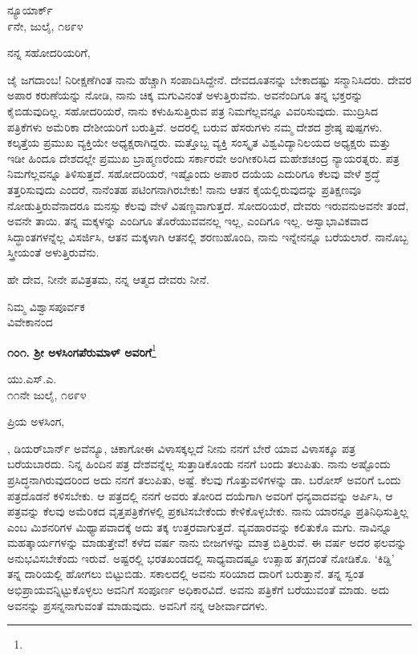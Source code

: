 \begin{flushright}
ನ್ಯೂಯಾರ್ಕ್\\೯ನೇ, ಜುಲೈ, ೧೮೯೪
\end{flushright}

\noindent
ನನ್ನ ಸಹೋದರಿಯರಿಗೆ,

ಜೈ ಜಗದಾಂಬ! ನಿರೀಕ್ಷಣೆಗಿಂತ ನಾನು ಹೆಚ್ಚಾಗಿ ಸಂಪಾದಿಸಿದ್ದೇನೆ. ದೇವದೂತನನ್ನು ಬೇಕಾದಷ್ಟು ಸನ್ಮಾನಿಸಿದರು. ದೇವರ ಅಪಾರ ಕರುಣೆಯನ್ನು ನೋಡಿ, ನಾನು ಚಿಕ್ಕ ಮಗುವಿನಂತೆ ಅಳುತ್ತಿರುವೆನು. ಅವನೆಂದಿಗೂ ತನ್ನ ಭಕ್ತರನ್ನು ಕೈಬಿಡುವುದಿಲ್ಲ. ಸಹೋದರಿಯರೆ, ನಾನು ಕಳುಹಿಸುತ್ತಿರುವ ಪತ್ರ ನಿಮಗೆಲ್ಲವನ್ನೂ ವಿವರಿಸುವುದು. ಮುದ್ರಿಸಿದ ಪತ್ರಿಕೆಗಳು ಅಮೆರಿಕಾ ದೇಶೀಯರಿಗೆ ಬರುತ್ತಿವೆ. ಅದರಲ್ಲಿ ಬರುವ ಹೆಸರುಗಳು ನಮ್ಮ ದೇಶದ ಶ್ರೇಷ್ಠ ಪುಷ್ಪಗಳು. ಕಲ್ಕತ್ತೆಯ ಪ್ರಮುಖ ವ್ಯಕ್ತಿಯೇ ಅಧ್ಯಕ್ಷರಾಗಿದ್ದರು. ಮತ್ತೊಬ್ಬ ವ್ಯಕ್ತಿ ಸಂಸ್ಕೃತ ವಿಶ್ವವಿದ್ಯಾನಿಲಯದ ಅಧ್ಯಕ್ಷರು ಮತ್ತು ಇಡೀ ಹಿಂದೂ ದೇಶದಲ್ಲೇ ಪ್ರಮುಖ ಬ್ರಾಹ್ಮಣರೆಂದು ಸರ್ಕಾರವೇ ಅಂಗೀಕರಿಸಿದ ಮಹೇಶಚಂದ್ರ ನ್ಯಾಯರತ್ನರು. ಪತ್ರ ನಿಮಗೆಲ್ಲವನ್ನೂ ತಿಳಿಸುತ್ತದೆ. ಸಹೋದರಿಯರೆ, ಇಷ್ಟೊಂದು ಅಪಾರ ದಯೆಯ ಎದುರಿಗೂ ಕೆಲವು ವೇಳೆ ಶ್ರದ್ಧೆ ತತ್ತರಿಸುವುದು ಎಂದರೆ, ನಾನೆಂತಹ ಪಟಿಂಗನಾಗಿರಬೇಕು! ನಾನು ಆತನ ಕೈಯಲ್ಲಿರುವುದನ್ನು ಪ್ರತಿಕ್ಷಣವೂ ನೋಡುತ್ತಿರುವೆನಾದರೂ ಮನಸ್ಸು ಕೆಲವು ವೇಳೆ ವಿಷಣ್ಣವಾಗುತ್ತದೆ. ಸೋದರಿಯರೆ, ದೇವರು ಇರುವನು\enginline{-}ಅವನೇ ತಂದೆ, ಅವನೇ ತಾಯಿ. ತನ್ನ ಮಕ್ಕಳನ್ನು ಎಂದಿಗೂ ತೊರೆಯುವವನಲ್ಲ \enginline{-}ಇಲ್ಲ, ಎಂದಿಗೂ ಇಲ್ಲ. ಅಸ್ವಾಭಾವಿಕವಾದ ಸಿದ್ಧಾಂತಗಳನ್ನೆಲ್ಲ ವಿಸರ್ಜಿಸಿ, ಆತನ ಮಕ್ಕಳಾಗಿ ಆತನಲ್ಲಿ ಶರಣುಹೊಂದಿ, ನಾನು ಇನ್ನೇನನ್ನೂ ಬರೆಯಲಾರೆ. ನಾನೊಬ್ಬ ಸ್ತ್ರೀಯಂತೆ ಅಳುತ್ತಿರುವೆನು.

\eject

ಹೇ ದೇವ, ನೀನೇ ಪವಿತ್ರತಮ, ನನ್ನ ಆತ್ಮದ ದೇವರು ನೀನೆ.

{\flushright
ನಿಮ್ಮ ವಿಶ್ವಾಸಪೂರ್ವಕ\\ವಿವೇಕಾನಂದ\par}

\begin{center}
\textbf{೧೦೧. ಶ‍್ರೀ ಅಳಸಿಂಗಪೆರುಮಾಳ್ ಅವರಿಗೆ}\footnote{}
\end{center}

\begin{flushright}
ಯು.ಎಸ್.ಎ.\\೧೧ನೇ ಜುಲೈ, ೧೮೯೪
\end{flushright}

\noindent
ಪ್ರಿಯ ಅಳಸಿಂಗ,
\vspace{0.3cm}

, ಡಿಯರ್‌ಬಾರ್ನ್ ಅವೆನ್ಯೂ, ಚಿಕಾಗೋ\enginline{-}ಈ ವಿಳಾಸಕ್ಕಲ್ಲದೆ ನೀನು ನನಗೆ ಬೇರೆ ಯಾವ ವಿಳಾಸಕ್ಕೂ ಪತ್ರ ಬರೆಯಬಾರದು. ನಿನ್ನ ಹಿಂದಿನ ಪತ್ರ ದೇಶವನ್ನೆಲ್ಲ ಸುತ್ತಾಡಿಕೊಂಡು ನನಗೆ ಬಂದು ತಲುಪಿತು. ನಾನು ಅಷ್ಟೊಂದು ಪ್ರಸಿದ್ಧನಾಗಿರುವುದರಿಂದ ಅದು ನನಗೆ ತಲುಪಿತು, ಅಷ್ಟೆ. ಕೆಲವು ಗೊತ್ತುವಳಿಗಳನ್ನು ಡಾ. ಬರೋಸ್ ಅವರಿಗೆ ಒಂದು ಪತ್ರದೊಡನೆ ಕಳಿಸಬೇಕು. ಆ ಪತ್ರದಲ್ಲಿ ನನಗೆ ಅವರು ತೋರಿದ ದಯೆಗಾಗಿ ಅವರಿಗೆ ಧನ್ಯವಾದವನ್ನು ಅರ್ಪಿಸಿ, ಆ ಪತ್ರವನ್ನು ಕೆಲವು ಅಮೆರಿಕದ ವೃತ್ತಪತ್ರಿಕೆಗಳಲ್ಲಿ ಪ್ರಕಟಿಸಬೇಕೆಂದು ಕೇಳಿಕೊಳ್ಳಬೇಕು. ನಾನು ಯಾರನ್ನೂ ಪ್ರತಿನಿಧಿಸುತ್ತಿಲ್ಲ ಎಂಬ ಮಿಶನರಿಗಳ ಮಿಥ್ಯಾಪವಾದಕ್ಕೆ ಅದು ತಕ್ಕ ಉತ್ತರವಾಗುತ್ತದೆ. ವ್ಯವಹಾರವನ್ನು ಕಲಿತುಕೊ ಮಗು. ನಾವಿನ್ನೂ ಮಹತ್ಕಾರ್ಯಗಳನ್ನು ಮಾಡುತ್ತೇವೆ! ಕಳೆದ ವರ್ಷ ನಾನು ಬೀಜಗಳನ್ನು ಮಾತ್ರ ಬಿತ್ತಿರುವೆ. ಈ ವರ್ಷ ಅದರ ಫಲವನ್ನು ಅನುಭವಿಸಬೇಕೆಂದು ಇರುವೆ. ಅಷ್ಟರಲ್ಲಿ ಭರತಖಂಡದಲ್ಲಿ ಸಾಧ್ಯವಾದಷ್ಟೂ ಉತ್ಸಾಹ ತಗ್ಗದಂತೆ ನೋಡಿಕೊ. ‘ಕಿಡ್ಡಿ’ ತನ್ನ ದಾರಿಯಲ್ಲಿ ಹೋಗಲು ಬಿಟ್ಟುಬಿಡು. ಸಕಾಲದಲ್ಲಿ ಅವನು ಸರಿಯಾದ ದಾರಿಗೆ ಬರುತ್ತಾನೆ. ತನ್ನ ಸ್ವಂತ ಅಭಿಪ್ರಾಯವನ್ನಿಟ್ಟುಕೊಳ್ಳಲು ಅವನಿಗೆ ಸಂಪೂರ್ಣ ಅಧಿಕಾರವಿದೆ. ಅವನು ಪತ್ರಿಕೆಗೆ ಬರೆಯುವಂತೆ ಮಾಡು. ಅದು ಅವನನ್ನು ಪ್ರಸನ್ನನಾಗುವಂತೆ ಮಾಡುವುದು. ಅವನಿಗೆ ನನ್ನ ಆಶೀರ್ವಾದಗಳು.
\vspace{0.3cm}

